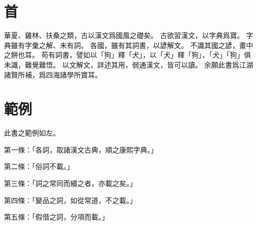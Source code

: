 \section{首}
華夏、雞林、扶桑之類，古以漢文爲國風之礎矣。
古欲習漢文，以字典爲寶。
字典雖有字彙之解、未有詞。
各國，雖有其詞書，以諺解文。
不識其國之諺，畫中之餅也耳。
苟有詞書，譬如以「狗」釋「犬」，以「犬」釋「狗」，「犬」「狗」俱未識，難覺難悟。
以文解文，詳述其用，弱通漢文，皆可以讀。
余願此書爲江湖諸賢所補，爲四海諸學所寶耳。
\section{範例}
此書之範例如左。
\par 第一條：「各詞，取諸漢文古典，順之康熙字典。」
\par 第二條：「俗詞不載。」
\par 第三條：「詞之常同而綴之者，亦載之矣。」
\par 第四條：「變品之詞，如從常道，不之載。」
\par 第五條：「假借之詞，分項而載。」
